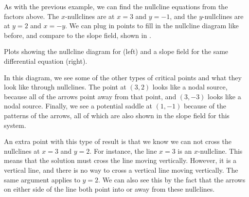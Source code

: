 \documentclass{ximera}
\begin{document}
\begin{exampleSol}
    As with the previous example, we can find the nullcline equations from the factors above. The $x$-nullclines are at $x=3$ and $y=-1$, and the $y$-nullclines are at $y=2$ and $x=-y$. We can plug in points to fill in the nullcline diagram like before, and compare to the slope field, shown in . 
    
    \begin{myfig}
        \capstart
        \caption{Plots showing the nullcline diagram for  (left) and a slope field for the same differential equation (right). \label{fig:NCPlot2}}
    \end{myfig}
    
    In this diagram, we see some of the other types of critical points and what they look like through nullclines. The point at $(3,2)$ looks like a nodal source, because all of the arrows point away from that point, and $(3,-3)$ looks like a nodal source. Finally, we see a potential saddle at $(1,-1)$ because of the patterns of the arrows, all of which are also shown in the slope field for this system.
    
    An extra point with this type of result is that we know we can not cross the nullclines at $x=3$ and $y=2$. For instance, the line $x=3$ is an $x$-nullcline. This means that the solution must cross the line moving vertically. However, it is a vertical line, and there is no way to cross a vertical line moving vertically. The same argument applies to $y=2$. We can also see this by the fact that the arrows on either side of the line both point into or away from these nullclines.
\end{exampleSol}
\end{document}
